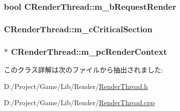 \subsubsection[{m\+\_\+b\+Request\+Render}]{\setlength{\rightskip}{0pt plus 5cm}bool C\+Render\+Thread\+::m\+\_\+b\+Request\+Render\hspace{0.3cm}{\ttfamily [private]}}\label{class_c_render_thread_a4684335c2982479e810c5e63ff07d246}
\hypertarget{class_c_render_thread_ab774ece4ffa6cd618cd02b888d9da06e}{}
\subsubsection[{m\+\_\+c\+Critical\+Section}]{ C\+Render\+Thread\+::m\+\_\+c\+Critical\+Section\hspace{0.3cm}{\ttfamily [private]}}\label{class_c_render_thread_ab774ece4ffa6cd618cd02b888d9da06e}
\hypertarget{class_c_render_thread_a781f8748290e6d59f8542b7f6b288815}{}
\subsubsection[{m\+\_\+pc\+Render\+Context}]{$\ast$ C\+Render\+Thread\+::m\+\_\+pc\+Render\+Context\hspace{0.3cm}{\ttfamily [private]}}\label{class_c_render_thread_a781f8748290e6d59f8542b7f6b288815}


このクラス詳解は次のファイルから抽出されました\+:\begin{DoxyCompactItemize}
\item 
D\+:/\+Project/\+Game/\+Lib/\+Render/\hyperlink{_render_thread_8h}{Render\+Thread.\+h}\item 
D\+:/\+Project/\+Game/\+Lib/\+Render/\hyperlink{_render_thread_8cpp}{Render\+Thread.\+cpp}\end{DoxyCompactItemize}
